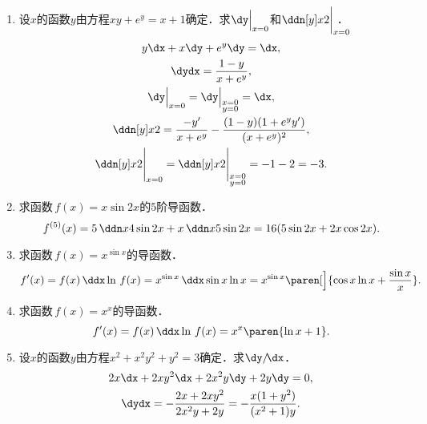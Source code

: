 \begin{enumerate}
\item 设\(x\)的函数\(y\)由方程\(xy + e^y = x + 1\)确定．求\(\dy\Big\vert_{x=0}\)和\(\ddn[y]x2\bigg\vert_{x=0}\mkern-22mu\)．
  \ifshowsol
  \begingroup
  \addtolength{\jot}{1ex}
  \begin{gather*}
    y \dx + x \dy + e^y \dy = \dx, \\
    \dydx = \frac{1-y}{x+e^y}, \\
    \dy\Big\vert_{x=0} = \dy\Big\vert_{\substack{x=0 \\ y =0}} = \dx, \\
    \ddn[y]x2 = \frac{-y'}{x+e^y} - \frac{(1-y)(1+e^yy')}{(x+e^y)^2}, \\
    \ddn[y]x2\Bigg\vert_{x=0}
    = \ddn[y]x2\Bigg\vert_{\substack{x=0 \\ y =0}}
    = -1 - 2 = -3.
  \end{gather*}
  \endgroup
  \fi

\item 求函数\(\,f(x) = x \sin 2x\)的\(5\)阶导函数．
  \ifshowsol
  \begin{equation*}
    f^{(5)}(x)
    = 5 \,\ddn x4 \sin 2x + x \,\ddn x5 \sin 2x
    = 16 (5\sin 2x + 2x \cos 2x).
  \end{equation*}
  \fi

\item 求函数\(\,f(x) = x^{\sin x}\)的导函数．
  \ifshowsol
  \begin{equation*}
    f'(x)
    = f(x) \,\ddx \ln\,f(x)
    = x^{\sin x} \,\ddx \sin x \ln x
    = x^{\sin x} \paren[\Big]{\cos x \ln x + \frac{\sin x}{x}}.
  \end{equation*}
  \fi

\item 求函数\(\,f(x) = x^x\)的导函数．
  \ifshowsol
  \begin{equation*}
    f'(x)
    = f(x) \,\ddx \ln\,f(x)
    = x^x \paren{\ln x + 1}.
  \end{equation*}
  \fi

\item 设\(x\)的函数\(y\)由方程\(x^2 + x^2y^2 + y^2 = 3\)确定．求\(\dy/\!\dx\)．
  \ifshowsol
  \begin{gather*}
    2x \dx + 2xy^2 \dx + 2x^2y \dy + 2y \dy = 0, \\
    \dydx = - \frac{2x+2xy^2}{2x^2y+2y} = - \frac{x(1+y^2)}{(x^2+1)y}.
  \end{gather*}
  \fi
\end{enumerate}
\fi
